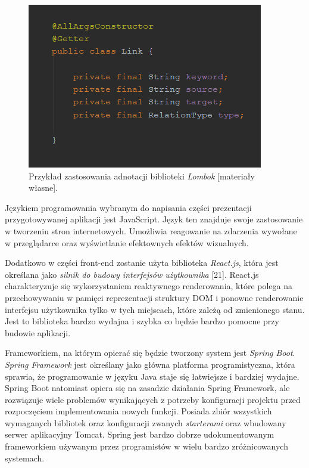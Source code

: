 \begin{figure}[h] %
	\centering
	\includegraphics[width=0.6\linewidth]{img/tools_lombok_1}
	\caption{Przykład zastosowania adnotacji biblioteki \textit{Lombok} [materiały własne].}
\end{figure}

Językiem programowania wybranym do napisania części prezentacji przygotowywanej aplikacji jest JavaScript. Język ten znajduje swoje zastosowanie w tworzeniu stron internetowych. Umożliwia reagowanie na zdarzenia wywołane w przeglądarce oraz wyświetlanie efektownych efektów wizualnych. 

Dodatkowo w części front-end zostanie użyta biblioteka \textit{React.js}, która jest określana jako \textit{silnik do budowy interfejsów użytkownika} [21]. React.js charakteryzuje się wykorzystaniem reaktywnego renderowania, które polega na przechowywaniu w pamięci reprezentacji struktury DOM i ponowne renderowanie interfejsu użytkownika tylko w tych miejscach, które zależą od zmienionego stanu. Jest to biblioteka bardzo wydajna i szybka co będzie bardzo pomocne przy budowie aplikacji.

Frameworkiem, na którym opierać się będzie tworzony system jest \textit{Spring Boot}. \textit{Spring Framework} jest określany jako główna platforma programistyczna, która sprawia, że programowanie w języku Java staje się łatwiejsze i bardziej wydajne. Spring Boot natomiast opiera się na zasadzie działania Spring Framework, ale rozwiązuje wiele problemów wynikających z potrzeby konfiguracji projektu przed rozpoczęciem implementowania nowych funkcji. Posiada zbiór wszystkich wymaganych bibliotek oraz konfiguracji zwanych \textit{starterami} oraz wbudowany serwer aplikacyjny Tomcat. Spring jest bardzo dobrze udokumentowanym frameworkiem używanym przez programistów w wielu bardzo zróżnicowanych systemach.

